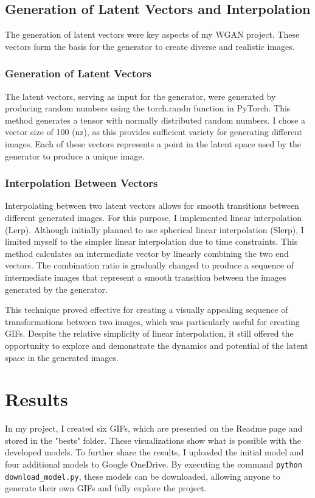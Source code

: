 \documentclass[a4paper, 12pt]{article}
\begin{document}
\subsection{Generation of Latent Vectors and Interpolation}
The generation of latent vectors were key aspects of my WGAN project. These vectors form the basis for the generator to create diverse and realistic images.

\subsubsection{Generation of Latent Vectors}
The latent vectors, serving as input for the generator, were generated by producing random numbers using the torch.randn function in PyTorch. This method generates a tensor with normally distributed random numbers. I chose a vector size of 100 (nz), as this provides sufficient variety for generating different images. Each of these vectors represents a point in the latent space used by the generator to produce a unique image.

\subsubsection{Interpolation Between Vectors}
Interpolating between two latent vectors allows for smooth transitions between different generated images. For this purpose, I implemented linear interpolation (Lerp). Although initially planned to use spherical linear interpolation (Slerp), I limited myself to the simpler linear interpolation due to time constraints. This method calculates an intermediate vector by linearly combining the two end vectors. The combination ratio is gradually changed to produce a sequence of intermediate images that represent a smooth transition between the images generated by the generator.

This technique proved effective for creating a visually appealing sequence of transformations between two images, which was particularly useful for creating GIFs. Despite the relative simplicity of linear interpolation, it still offered the opportunity to explore and demonstrate the dynamics and potential of the latent space in the generated images.

\section{Results}
In my project, I created six GIFs, which are presented on the Readme page and stored in the "bests" folder. These visualizations show what is possible with the developed models. To further share the results, I uploaded the initial model and four additional models to Google OneDrive. By executing the command \texttt{python download\_model.py}, these models can be downloaded, allowing anyone to generate their own GIFs and fully explore the project.
\end{document}
